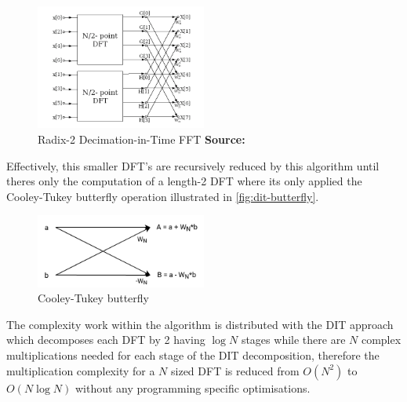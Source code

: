 \documentclass[
  oneside,
  11pt, a4paper,
  footinclude=true,
  headinclude=true,
  cleardoublepage=empty
]{scrbook}
\newcommand*{\source}[1]{%
    \textbf{Source:} \cite{#1}%
}
\begin{document}

\begin{figure}[h] 
    \centering
    \includegraphics[width=0.5\textwidth]{img/dit_fft.png}
    \caption{Radix-2 Decimation-in-Time FFT \source{jones2014digital}}
    \label{fig:dit-fft}
\end{figure}


Effectively, this smaller DFT's are recursively reduced by this algorithm until theres only the computation of a length-2 DFT where its only applied the Cooley-Tukey butterfly operation \cite{chu1999inside} illustrated in \autoref{fig:dit-butterfly}.

\begin{figure}[h] 
    \centering
    \includegraphics[width=0.5\textwidth]{img/dit_butterfly.png}
    \caption{Cooley-Tukey butterfly}
    \label{fig:dit-butterfly}
\end{figure}


The complexity work within the algorithm is distributed with the DIT approach which decomposes each DFT by 2 having \(\log{N}\) stages \cite{smith2007mathematics} while there are \(N\) complex multiplications needed for each stage of the DIT decomposition, therefore the multiplication complexity for a \(N\) sized DFT is reduced from \(O(N^{2})\) to \(O(N \log{N})\) without any programming specific optimisations.
\end{document}
